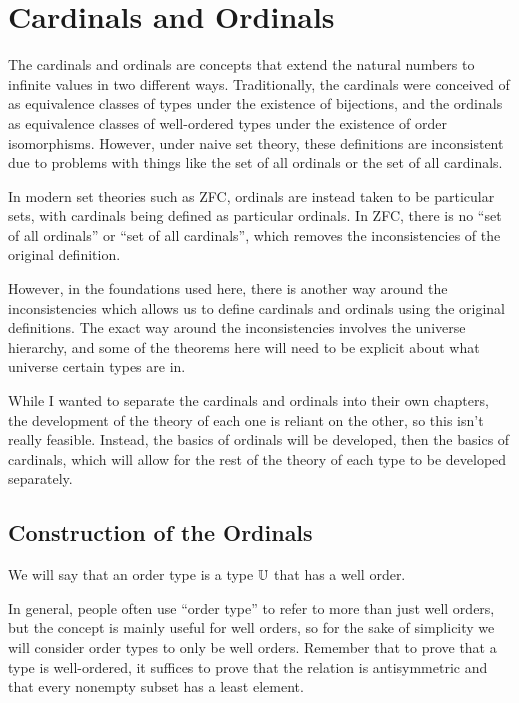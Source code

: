 \documentclass[../../math.tex]{subfiles}
\begin{document}
\setcounter{chapter}{8}

\chapter{Cardinals and Ordinals}

The cardinals and ordinals are concepts that extend the natural numbers to
infinite values in two different ways.  Traditionally, the cardinals were
conceived of as equivalence classes of types under the existence of bijections,
and the ordinals as equivalence classes of well-ordered types under the
existence of order isomorphisms.  However, under naive set theory, these
definitions are inconsistent due to problems with things like the set of all
ordinals or the set of all cardinals.

In modern set theories such as ZFC, ordinals are instead taken to be particular
sets, with cardinals being defined as particular ordinals.  In ZFC, there is no
``set of all ordinals'' or ``set of all cardinals'', which removes the
inconsistencies of the original definition.

However, in the foundations used here, there is another way around the
inconsistencies which allows us to define cardinals and ordinals using the
original definitions.  The exact way around the inconsistencies involves the
universe hierarchy, and some of the theorems here will need to be explicit about
what universe certain types are in.

While I wanted to separate the cardinals and ordinals into their own chapters,
the development of the theory of each one is reliant on the other, so this isn't
really feasible.  Instead, the basics of ordinals will be developed, then the
basics of cardinals, which will allow for the rest of the theory of each type to
be developed separately.

\section{Construction of the Ordinals}

\begin{definition}
    We will say that an order type is a type $\mathbb{U}$ that has a well order.
\end{definition}

In general, people often use ``order type'' to refer to more than just well
orders, but the concept is mainly useful for well orders, so for the sake of
simplicity we will consider order types to only be well orders.  Remember that
to prove that a type is well-ordered, it suffices to prove that the relation is
antisymmetric and that every nonempty subset has a least element.
\end{document}
